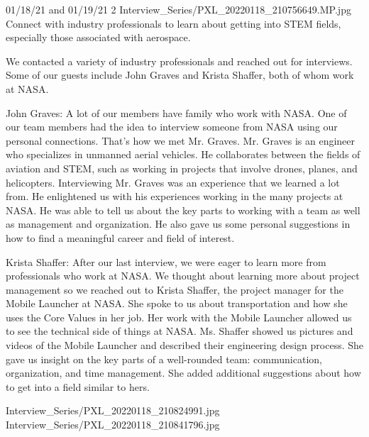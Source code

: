 {01/18/21 and 01/19/21}
{2}
{Interview_Series/PXL_20220118_210756649.MP.jpg}
{Connect with industry professionals to learn about getting into STEM fields, especially those associated with aerospace.} 
{
We contacted a variety of industry professionals and reached out for interviews. Some of our guests include John Graves and Krista Shaffer, both of whom work at NASA.

John Graves:
A lot of our members have family who work with NASA. One of our team members had the idea to interview someone from NASA using our personal connections. That’s how we met Mr. Graves. Mr. Graves is an engineer who specializes in unmanned aerial vehicles. He collaborates between the fields of aviation and STEM, such as working in projects that involve drones, planes, and helicopters. Interviewing Mr. Graves was an experience that we learned a lot from. He enlightened us with his experiences working in the many projects at NASA. He was able to tell us about the key parts to working with a team as well as management and organization. He also gave us some personal suggestions in how to find a meaningful career and field of interest. 

Krista Shaffer:
After our last interview, we were eager to learn more from professionals who work at NASA. We thought about learning more about project management so we reached out to Krista Shaffer, the project manager for the Mobile Launcher at NASA. She spoke to us about transportation and how she uses the Core Values in her job. Her work with the Mobile Launcher allowed us to see the technical side of things at NASA. Ms. Shaffer showed us pictures and videos of the Mobile Launcher and described their engineering design process. She gave us insight on the key parts of a well-rounded team: communication, organization, and time management. She added additional suggestions about how to get into a field similar to hers. 

} 
{Interview_Series/PXL_20220118_210824991.jpg}
{Interview_Series/PXL_20220118_210841796.jpg}
